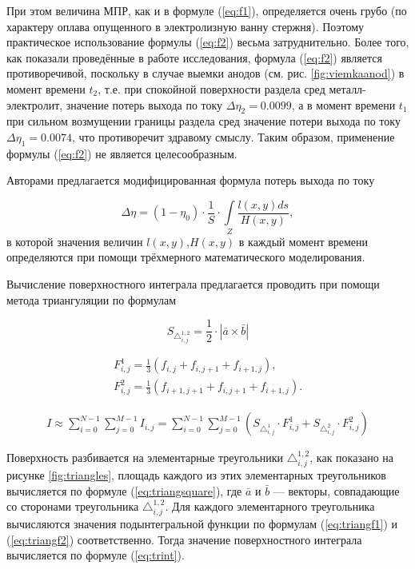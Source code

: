\documentclass[pdflatex,sn-mathphys-gost]{pmi-jnl}
\begin{document}
При этом величина МПР, как и в формуле (\ref{eq:f1}), определяется очень грубо (по характеру оплава опущенного в электролизную ванну стержня). Поэтому практическое использование формулы (\ref{eq:f2}) весьма затруднительно. Более того, как показали проведённые в работе исследования, формула (\ref{eq:f2}) является противоречивой, поскольку в случае выемки анодов (см. рис. \ref{fig:viemkaanod}) в момент времени $t_2$, т.е. при спокойной поверхности раздела сред металл-электролит, значение  потерь выхода по току $\Delta\eta_2 = 0.0099$, а в момент времени $t_1$ при сильном возмущении границы раздела сред значение потери выхода по току $\Delta\eta_1 = 0.0074$, что противоречит здравому смыслу.  Таким образом, применение формулы (\ref{eq:f2}) не является целесообразным.

Авторами предлагается модифицированная формула потерь выхода по току

\begin{equation} \label{eq:modf2}
	\Delta \eta = (1- \eta_0) \cdot \frac{1}{S} \cdot \int\limits_Z \frac{l(x,y) ds}{H(x,y)},
\end{equation}
в которой значения величин $l(x,y)$,$ H(x,y)$ в каждый момент времени определяются при помощи трёхмерного математического моделирования.

Вычисление поверхностного интеграла предлагается проводить при помощи метода триангуляции по формулам

\begin{equation}\label{eq:triangsquare}
	{S_{\triangle_{i,j}^{1,2}}} = \frac{1}{2} \cdot |\bar{a} \times \bar{b}|
\end{equation}

\begin{align}
	F^1_{i,j} = \frac{1}{3}(f_{i,j}+f_{i,j+1}+f_{i+1,j}), \label{eq:triangf1}\\
	F^2_{i,j} = \frac{1}{3}(f_{i+1,j+1}+f_{i,j+1}+f_{i+1,j}). \label{eq:triangf2}
\end{align}

\begin{align}\label{eq:trint}
	I \approx \sum_{i=0}^{N-1} \sum_{j=0}^{M-1} I_{i,j} = \sum_{i=0}^{N-1} \sum_{j=0}^{M-1} (S_{\triangle_{i,j}^1} \cdot F_{i,j}^1 + S_{\triangle_{i,j}^2} \cdot F_{i,j}^2)
\end{align}

Поверхность разбивается на элементарные треугольники $\triangle_{i,j}^{1,2}$, как показано на рисунке \ref{fig:triangles}, площадь каждого из этих элементарных треугольников вычисляется по формуле (\ref{eq:triangsquare}), где $\bar{a}$ и $\bar{b}$ — векторы, совпадающие со сторонами треугольника $\triangle_{i,j}^{1,2}$. Для каждого элементарного треугольника вычисляются значения подынтегральной функции по формулам (\ref{eq:triangf1}) и (\ref{eq:triangf2}) соответственно. Тогда значение поверхностного интеграла вычисляется по формуле (\ref{eq:trint}).
\end{document}
